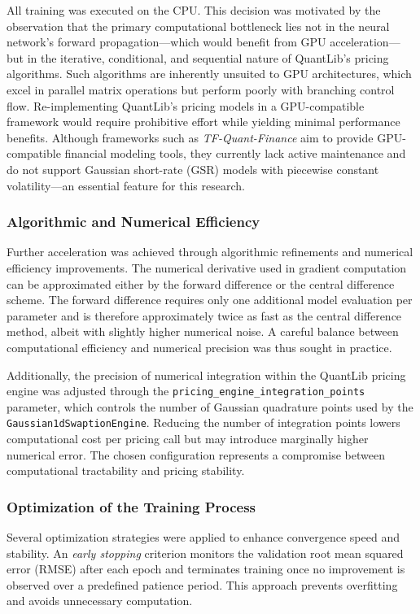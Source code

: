 {All training was executed on the CPU. This decision was motivated by the observation that the primary computational bottleneck lies not in the neural network’s forward propagation—which would benefit from GPU acceleration—but in the iterative, conditional, and sequential nature of QuantLib’s pricing algorithms. Such algorithms are inherently unsuited to GPU architectures, which excel in parallel matrix operations but perform poorly with branching control flow. Re-implementing QuantLib’s pricing models in a GPU-compatible framework would require prohibitive effort while yielding minimal performance benefits. Although frameworks such as \textit{TF-Quant-Finance} aim to provide GPU-compatible financial modeling tools, they currently lack active maintenance and do not support Gaussian short-rate (GSR) models with piecewise constant volatility—an essential feature for this research.

\subsubsection{Algorithmic and Numerical Efficiency}
Further acceleration was achieved through algorithmic refinements and numerical efficiency improvements. The numerical derivative used in gradient computation can be approximated either by the forward difference or the central difference scheme. The forward difference requires only one additional model evaluation per parameter and is therefore approximately twice as fast as the central difference method, albeit with slightly higher numerical noise. A careful balance between computational efficiency and numerical precision was thus sought in practice.

Additionally, the precision of numerical integration within the QuantLib pricing engine was adjusted through the \texttt{pricing\_engine\_integration\_points} parameter, which controls the number of Gaussian quadrature points used by the \texttt{Gaussian1dSwaptionEngine}. Reducing the number of integration points lowers computational cost per pricing call but may introduce marginally higher numerical error. The chosen configuration represents a compromise between computational tractability and pricing stability.

\subsubsection{Optimization of the Training Process}
Several optimization strategies were applied to enhance convergence speed and stability. An \textit{early stopping} criterion monitors the validation root mean squared error (RMSE) after each epoch and terminates training once no improvement is observed over a predefined patience period. This approach prevents overfitting and avoids unnecessary computation.

}
